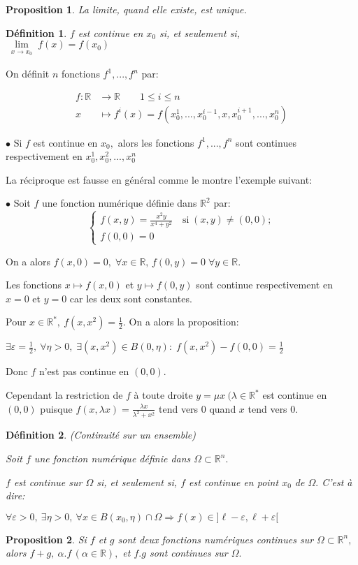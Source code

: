 \documentclass[11pt,a4paper]{report}
\newtheorem{definition}{Définition}[section]
\newtheorem{proposition}{Proposition}[section]
\begin{document}
\begin{proposition}
La limite, quand elle existe, est unique.
\end{proposition}
\begin{definition}
$f$ est continue en $x_0$ si, et seulement si,\\ $\lim\limits_{\substack{x \rightarrow x_0}} f(x)=f(x_0)$
\end{definition}

On définit $n$ fonctions $f^1,...,f^n$ par:

\begin{align*}
f:\mathbb{R} &\rightarrow \mathbb{R}\qquad 1\leq i\leq n\\
x&\mapsto f^i(x)=f(x_{0}^{1},...,x_{0}^{i-1},x,x_{0}^{i+1},...,x_{0}^{n})
\end{align*}

$\bullet$ Si $f$ est continue en $x_0,$ alors les fonctions $f^1,...,f^n$ sont continues respectivement en $x_{0}^{1},x_{0}^{2},...,x_{0}^{n}$

La réciproque est fausse en général comme le montre l'exemple suivant:

$\bullet$ Soit $f$ une fonction numérique définie dans $\mathbb{R}^2$ par:
$$\begin{cases}
f(x,y)=\frac{x^2 y}{x^4+y^2}\quad\mbox{si}\;(x,y)\neq (0,0); \\
f(0,0)=0
\end{cases}$$

On a alors $f(x,0)=0,\;\forall x\in \mathbb{R},\, f(0,y)=0\;\forall y\in \mathbb{R}.$

Les fonctions $x\mapsto f(x,0)$ et $y\mapsto f(0,y)$ sont continue respectivement en $x=0$ et $y=0$ car les deux sont constantes.

Pour $x\in \mathbb{R}^{*},\:f(x,x^2)=\frac{1}{2}.$ On a alors la proposition:

$\exists \varepsilon=\frac{1}{2},\:\forall \eta >0,\;\exists (x,x^2)\in B(0,\eta):\;f(x,x^2)-f(0,0)=\frac{1}{2}$

Donc $f$ n'est pas continue en $(0,0).$

Cependant la restriction de $f$ à toute droite $y=\mu x\:(\lambda\in \mathbb{R}^{*}$ est continue en $(0,0)$ puisque $f(x,\lambda x)=\frac{\lambda x}{\lambda^2+x^2}$ tend vers $0$ quand $x$ tend vers $0.$

\begin{definition}(Continuité sur un ensemble)

Soit $f$ une fonction numérique définie dans $\Omega\subset\mathbb{R}^n.$

$f$ est continue sur $\Omega$ si, et seulement si, $f$ est continue en point $x_0$ de $\Omega.$ C'est à dire:

$\forall \varepsilon>0,\:\exists \eta>0,\:\forall x\in B(x_0,\eta)\cap \Omega\Rightarrow f(x)\in ]\ell-\varepsilon,\ell+\varepsilon[$
\end{definition}
\begin{proposition}
Si $f$ et $g$ sont deux fonctions numériques continues sur $\Omega\subset\mathbb{R}^n,$ alors $f+g,\:\alpha.f\,(\alpha\in \mathbb{R}),$ et $f.g$ sont continues sur $\Omega.$
\end{proposition}
\end{document}
